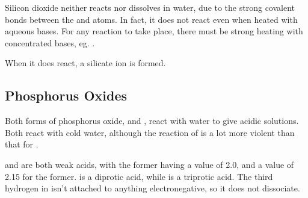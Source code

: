 			Silicon dioxide neither reacts nor dissolves in water, due to the strong covalent bonds between the  and  atoms.
			In fact, it does not react even when heated with aqueous bases. For any reaction to take place, there must be strong heating
			with concentrated bases, eg. .


			When it does react, a silicate ion is formed.




		\pagebreak
		\subsection{Phosphorus Oxides}

			Both forms of phosphorus oxide,  and , react with water to give acidic solutions. Both react with cold water,
			although the reaction of  is a lot more violent than that for .


			 and  are both weak acids, with the former having a \pKa{} value of \num{2.0}, and a value of \num{2.15} for the
			former.  is a diprotic acid, while  is a triprotic acid. The third hydrogen in  isn't attached to
			anything electronegative, so it does not dissociate.



